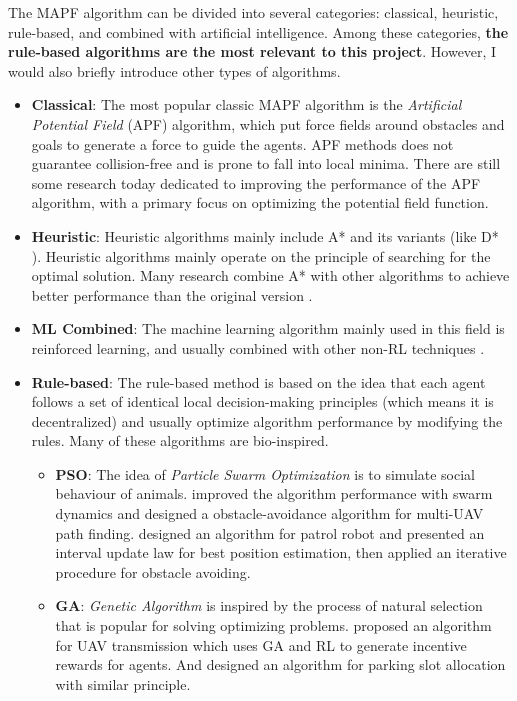 \documentclass[12pt, oneside]{article}
\begin{document}
The MAPF algorithm can be divided into several categories: classical, heuristic, rule-based, and combined with artificial intelligence. Among these categories, \textbf{the rule-based algorithms are the most relevant to this project}. However, I would also briefly introduce other types of algorithms.

\begin{itemize}
    \item \textbf{Classical}: The most popular classic MAPF algorithm is the \textit{Artificial Potential Field} (APF) algorithm, which put force fields around obstacles and goals to generate a force to guide the agents. APF methods does not guarantee collision-free and is prone to fall into local minima. There are still some research today dedicated to improving the performance of the APF algorithm, with a primary focus on optimizing the potential field function\cite{APF_improv1,APF_improv2,APF_improv3,APF_improv4}.
    \item \textbf{Heuristic}: Heuristic algorithms mainly include A* and its variants (like  D* \cite{D*}). Heuristic algorithms mainly operate on the principle of searching for the optimal solution. Many research combine A* with other algorithms to achieve better performance than the original version \cite{A*_1,A*_2}.
    \item \textbf{ML Combined}: The machine learning algorithm mainly used in this field is reinforced learning, and usually combined with other non-RL techniques \cite{RL_1,RL_2,RL_3,RL_4}.
    \item \textbf{Rule-based}: The rule-based method is based on the idea that each agent follows a set of identical local decision-making principles (which means it is decentralized) and usually optimize algorithm performance by modifying the rules. Many of these algorithms are bio-inspired.
     \begin{itemize}
         \item \textbf{PSO}: The idea of \textit{Particle Swarm Optimization} is to simulate social behaviour of animals. \cite{PSO_1} improved the algorithm performance with swarm dynamics and designed a obstacle-avoidance algorithm for multi-UAV path finding. \cite{PSO_2} designed an algorithm for patrol robot and presented an interval update law for best position estimation, then applied an iterative procedure for obstacle avoiding.
         \item \textbf{GA}: \textit{Genetic Algorithm} is inspired by the process of natural selection that is popular for solving optimizing problems. \cite{GA_1} proposed an algorithm for UAV transmission which uses GA and RL to generate incentive rewards for agents. And \cite{GA_2} designed an algorithm for parking slot allocation with similar principle.

\end{itemize}
\end{itemize}
\end{document}
